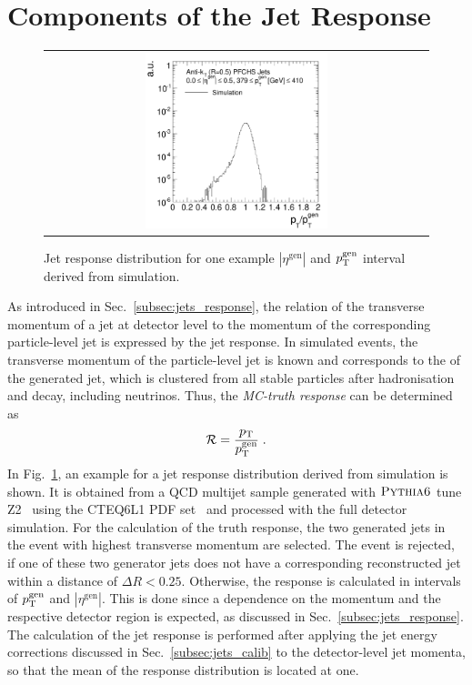 \section{Components of the Jet Response}
\label{sec:jer_response}
\begin{figure}[!tp]
  \centering
  \begin{tabular}{c}
                \includegraphics[width=0.49\textwidth]{figures/TruthResponse_example_test.pdf}
  \end{tabular}
  \caption{Jet response distribution for one example $|\eta^\mathrm{gen}|$ and $p_{\text{T}}^\mathrm{gen}$ interval derived from simulation.}
  \label{fig:response}
\end{figure}
As introduced in Sec.~\ref{subsec:jets_response}, the relation of the transverse momentum of a jet at detector level to the momentum of the corresponding particle-level jet is expressed by the jet response. In simulated events, the transverse momentum of the particle-level jet is known and corresponds to the \pt of the generated jet, which is clustered from all stable particles after hadronisation and decay, including neutrinos. Thus, the \textit{MC-truth response} can be determined as
\begin{equation}
\mathcal{R} = \frac{p_{\text{T}}}{p_{\text{T}}^{\mathrm{gen}}} \; .
\end{equation}
 In Fig.~\ref{fig:response}, an example for a jet response distribution derived from simulation is shown. It is obtained from a QCD multijet sample generated with $\textsc{Pythia6}$ tune Z2~\cite{Chatrchyan:2011id} using the CTEQ6L1 PDF set~\cite{Pumplin:2002vw} and processed with the full detector simulation. For the calculation of the truth response, the two generated jets in the event with highest transverse momentum are selected. The event is rejected, if one of these two generator jets does not have a corresponding reconstructed jet within a distance of $\Delta R < 0.25$. Otherwise, the response is calculated in intervals of $p_{\text{T}}^\mathrm{gen}$ and $|\eta^\mathrm{gen}|$. This is done since a dependence on the momentum and the respective detector region is expected, as discussed in Sec.~\ref{subsec:jets_response}. The calculation of the jet response is performed after applying the jet energy corrections discussed in Sec.~\ref{subsec:jets_calib} to the detector-level jet momenta, so that the mean of the response distribution is located at one. \\
